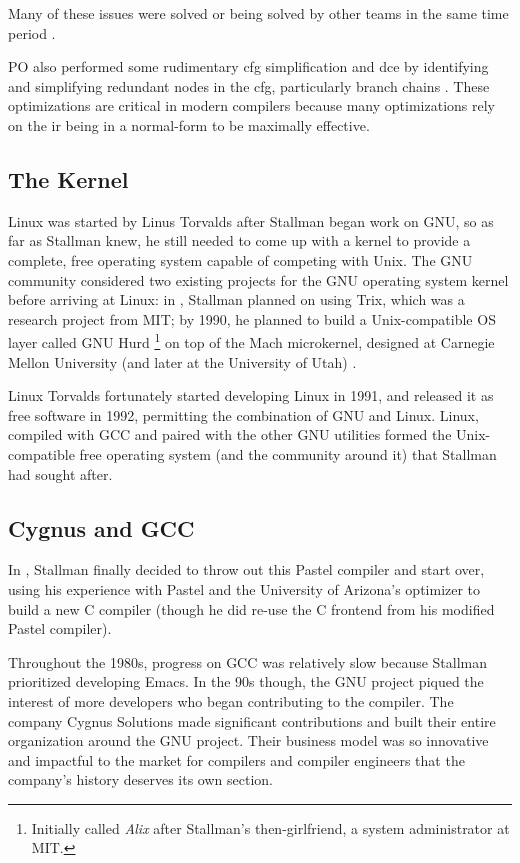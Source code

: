 Many of these issues were solved or being solved by other teams in the
same time period .

PO also performed some rudimentary \acrlong{cfg} simplification and
\acrlong{dce} by identifying and simplifying redundant nodes in the \acrshort{cfg},
particularly branch chains .
These optimizations are critical in modern compilers because many
optimizations rely on the \acrshort{ir} being in a \gls{normal-form}
to be maximally effective.

\subsection{The Kernel}

Linux was started by Linus Torvalds after Stallman began work on GNU,
so as far as Stallman knew, he still needed to come up with a kernel
to provide a complete, free operating system capable of competing with Unix.
The GNU community considered two existing projects for the GNU operating system kernel
before arriving at Linux:
in \citeyear{stallman_kth_transcript_1986}, Stallman planned on using Trix,
which was a research project from MIT; by 1990, he planned to build a Unix-compatible
OS layer called GNU Hurd
\footnote{Initially called \textit{Alix}
	after Stallman's then-girlfriend, a system administrator at MIT.}
on top of the Mach microkernel,
designed at Carnegie Mellon University (and later at the University of Utah)
\parencite{stallman_the_gnu_project}.

Linux Torvalds fortunately started developing Linux in 1991,
and released it as free software in 1992, permitting the combination
of GNU and Linux.
Linux, compiled with GCC and paired with the other GNU utilities
formed the Unix-compatible free operating system
(and the community around it) that Stallman had sought after.

\subsection{Cygnus and GCC}

In \citeyear{stallman_kth_transcript_1986}, Stallman finally decided to throw
out this Pastel compiler and start over, using his experience with Pastel
and the University of Arizona's optimizer to build a new C compiler
(though he did re-use the C frontend from his modified Pastel compiler).

Throughout the 1980s, progress on GCC was relatively slow because Stallman
prioritized developing Emacs.
In the 90s though, the GNU project piqued the interest of more developers
who began contributing to the compiler.
The company Cygnus Solutions made significant contributions and built
their entire organization around the GNU project.
Their business model was so innovative and impactful to the market for
compilers and compiler engineers that the company's history deserves
its own section.

